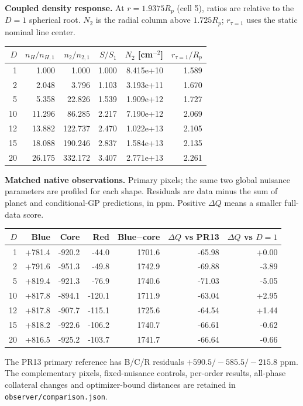 \textbf{Coupled density response.}
At $r=1.9375R_p$ (cell 5), ratios are relative to the $D=1$ spherical root.
$N_2$ is the radial column above $1.725R_p$; $r_{\tau=1}$ uses the static nominal line center.
\begin{center}\begin{tabular}{rrrrrr}
\toprule
$D$ & $n_H/n_{H,1}$ & $n_2/n_{2,1}$ & $S/S_1$ & $N_2$ [cm$^{-2}$] & $r_{\tau=1}/R_p$ \\
\midrule
1 & 1.000 & 1.000 & 1.000 & 8.415e+10 & 1.589 \\
2 & 2.048 & 3.796 & 1.103 & 3.193e+11 & 1.670 \\
5 & 5.358 & 22.826 & 1.539 & 1.909e+12 & 1.727 \\
10 & 11.296 & 86.285 & 2.217 & 7.190e+12 & 2.069 \\
12 & 13.882 & 122.737 & 2.470 & 1.022e+13 & 2.105 \\
15 & 18.088 & 190.246 & 2.837 & 1.584e+13 & 2.135 \\
20 & 26.175 & 332.172 & 3.407 & 2.771e+13 & 2.261 \\
\bottomrule\end{tabular}\end{center}
\textbf{Matched native observations.}
Primary pixels; the same two global nuisance parameters are profiled for each shape.
Residuals are data minus the sum of planet and conditional-GP predictions, in ppm.
Positive $\Delta Q$ means a smaller full-data score.
\begin{center}\begin{tabular}{rrrrrrr}\toprule
$D$ & Blue & Core & Red & Blue$-$core & $\Delta Q$ vs PR13 & $\Delta Q$ vs $D=1$ \\
\midrule
1 & +781.4 & -920.2 & -44.0 & 1701.6 & -65.98 & +0.00 \\
2 & +791.6 & -951.3 & -49.8 & 1742.9 & -69.88 & -3.89 \\
5 & +819.4 & -921.3 & -76.9 & 1740.6 & -71.03 & -5.05 \\
10 & +817.8 & -894.1 & -120.1 & 1711.9 & -63.04 & +2.95 \\
12 & +817.8 & -907.7 & -115.1 & 1725.6 & -64.54 & +1.44 \\
15 & +818.2 & -922.6 & -106.2 & 1740.7 & -66.61 & -0.62 \\
20 & +816.5 & -925.2 & -103.7 & 1741.7 & -66.64 & -0.66 \\
\bottomrule\end{tabular}\end{center}
The PR13 primary reference has B/C/R residuals $+590.5/-585.5/-215.8$ ppm.
The complementary pixels, fixed-nuisance controls, per-order results, all-phase collateral changes
and optimizer-bound distances are retained in \texttt{observer/comparison.json}.
